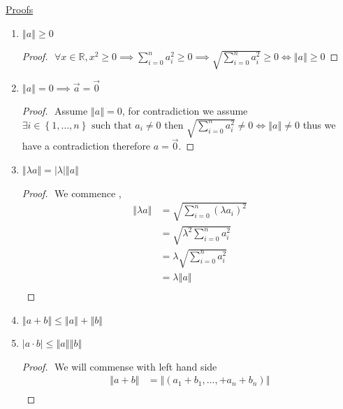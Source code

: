 \documentclass[11pt]{book}
\begin{document}
\underline{Proofs} 

\begin{enumerate}
    \item $\left\Vert a \right\Vert \ge 0$
        \begin{proof}
        $ $\newline
            $\forall x \in \mathbb{R} , x^2 \ge 0 \implies \sum_{i=0}^{n} a_{i} ^2 \ge 0 \implies \sqrt{\sum_{i=0}^{n} a_{i} ^2  } \ge 0 \Leftrightarrow \left\Vert a \right\Vert \ge 0$
        \end{proof}
    \item $\left\Vert a \right\Vert = 0 \implies \vec{a} = \vec{0} $
        \begin{proof}
        $ $\newline
            Assume $\left\Vert a \right\Vert = 0$, for contradiction we assume $\exists i \in \left\{ 1, \ldots , n \right\} \text{ such that } a_{i} \neq 0 $  then $\sqrt{\sum_{i=0}^{n} a_{i} ^2}  \neq 0 \Leftrightarrow \left\Vert a \right\Vert \neq 0$ thus we have a contradiction therefore $a = \vec{0} $.  
        \end{proof}
    \item $\left\Vert \lambda a \right\Vert = \left| \lambda  \right| \left\Vert a \right\Vert $ 
    \begin{proof}
    $ $\newline
    We commence ,
    \begin{align*}
        \left\Vert \lambda a \right\Vert &= \sqrt{\sum_{i=0}^{n} \left( \lambda a_{i}  \right) ^2  } \\
        &= \sqrt{\lambda ^2 \sum_{i=0}^{n} a_{i} ^2  }   \\ 
        &= \lambda \sqrt{\sum_{i=0}^{n} a_{i} ^2  }   \\ &= \lambda \left\Vert a \right\Vert   \\ 
    \end{align*}
    \end{proof}
    \item $\left\Vert a + b \right\Vert \le \left\Vert a \right\Vert  + \left\Vert b \right\Vert $ 
    \item $\left| a \cdot b \right| \le \left\Vert a \right\Vert \left\Vert b \right\Vert $ 
    \begin{proof}
    $ $\newline
    We will commense with left hand side 
        \begin{align*}
            \left\Vert a + b \right\Vert &= \left\Vert \left( a_1 + b_1, \ldots ,  + a_{n}  + b_{n}  \right)  \right\Vert   \\ 

\end{align*}
\end{proof}
\end{enumerate}
\end{document}
